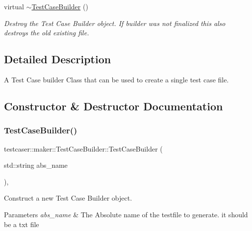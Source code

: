 \begin{DoxyCompactItemize}
\mbox{\label{classtestcaser_1_1maker_1_1TestCaseBuilder_ad463fd2e4c6175c15c310c4af66ec344}} 
virtual \hyperlink{classtestcaser_1_1maker_1_1TestCaseBuilder_ad463fd2e4c6175c15c310c4af66ec344}{$\sim$\+Test\+Case\+Builder} ()
\begin{DoxyCompactList}\small\item\em Destroy the Test Case Builder object. If builder was not finalized this also destroys the old existing file. \end{DoxyCompactList}\end{DoxyCompactItemize}


\subsection{Detailed Description}
A Test Case builder Class that can be used to create a single test case file. 

\subsection{Constructor \& Destructor Documentation}
\mbox{\label{classtestcaser_1_1maker_1_1TestCaseBuilder_a1faa00929cc5be8c8bbb312541858e61}} 
\subsubsection{\texorpdfstring{Test\+Case\+Builder()}{TestCaseBuilder()}}
{\footnotesize\ttfamily testcaser\+::maker\+::\+Test\+Case\+Builder\+::\+Test\+Case\+Builder (\begin{DoxyParamCaption}\item[{std\+::string}]{abs\+\_\+name }\end{DoxyParamCaption})\hspace{0.3cm}{\ttfamily [inline]}, {\ttfamily [explicit]}}



Construct a new Test Case Builder object. 


\begin{DoxyParams}{Parameters}
{\em abs\+\_\+name} & The Absolute name of the testfile to generate. it should be a txt file \\
\hline
\end{DoxyParams}


